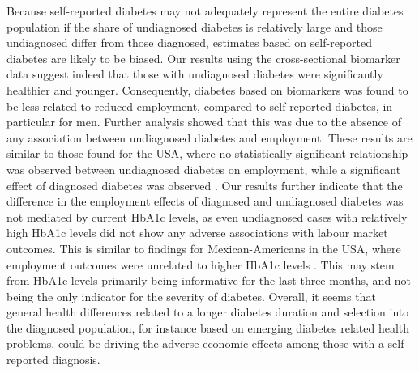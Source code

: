 \documentclass[12pt,english]{article}
\providecommand{\DIFaddtex}[1]{{\protect\color{blue}#1}} %
\providecommand{\DIFaddbegin}{} %
\providecommand{\DIFaddend}{} %
\providecommand{\DIFadd}[1]{\texorpdfstring{\DIFaddtex{#1}}{#1}} %
\begin{document}
Because self-reported diabetes may not adequately represent the entire diabetes population if the share of undiagnosed diabetes is relatively large and those undiagnosed differ from those diagnosed, estimates based on self-reported diabetes are likely to be biased. Our results using the cross-sectional biomarker data suggest indeed that  those with undiagnosed diabetes were significantly healthier and younger. Consequently, diabetes based on biomarkers was found to be less related to reduced employment, compared to self-reported diabetes, in particular for men. Further analysis showed that this was due to the absence of any association between undiagnosed diabetes and employment. These results are similar to those found for the USA, where no statistically significant relationship was observed between undiagnosed diabetes on employment, while a significant effect of diagnosed diabetes was observed \parencite{Minor2015}. Our results further indicate that the  difference in the employment effects of diagnosed and undiagnosed diabetes was not mediated by current \ac{HbA1c} levels, \DIFaddbegin \DIFadd{as even undiagnosed cases with relatively high HbA1c levels did not show any adverse associations with labour market outcomes. This is }\DIFaddend similar to findings for Mexican-Americans in the USA, where employment outcomes were unrelated to higher \ac{HbA1c} levels \parencite{BrownIII2011}. This may stem from \ac{HbA1c} levels primarily being informative for the last three months, and not being the only indicator for the severity of diabetes. Overall, it seems that general health differences related to a longer diabetes duration and selection into the diagnosed population, for instance based on emerging diabetes related health problems, could be driving the adverse economic effects among those with a self-reported diagnosis.
\end{document}
